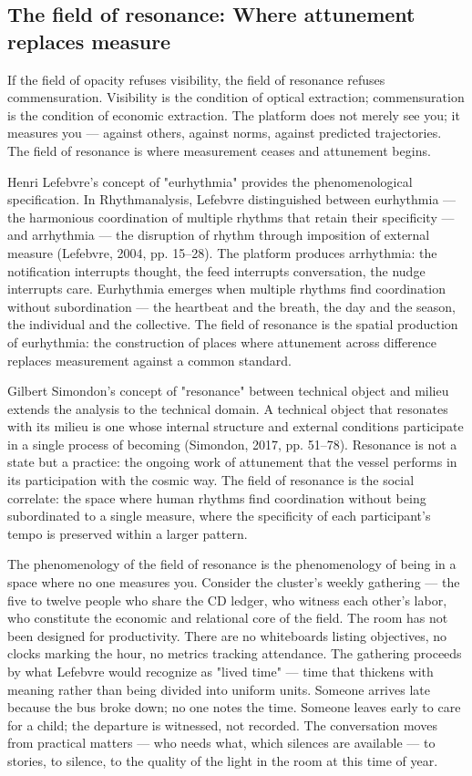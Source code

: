 \subsection{The field of resonance: Where attunement replaces measure}

If the field of opacity refuses visibility, the field of resonance refuses commensuration. Visibility is the condition of optical extraction; commensuration is the condition of economic extraction. The platform does not merely see you; it measures you — against others, against norms, against predicted trajectories. The field of resonance is where measurement ceases and attunement begins.

Henri Lefebvre's concept of "eurhythmia" provides the phenomenological specification. In Rhythmanalysis, Lefebvre distinguished between eurhythmia — the harmonious coordination of multiple rhythms that retain their specificity — and arrhythmia — the disruption of rhythm through imposition of external measure (Lefebvre, 2004, pp. 15–28). The platform produces arrhythmia: the notification interrupts thought, the feed interrupts conversation, the nudge interrupts care. Eurhythmia emerges when multiple rhythms find coordination without subordination — the heartbeat and the breath, the day and the season, the individual and the collective. The field of resonance is the spatial production of eurhythmia: the construction of places where attunement across difference replaces measurement against a common standard.

Gilbert Simondon's concept of "resonance" between technical object and milieu extends the analysis to the technical domain. A technical object that resonates with its milieu is one whose internal structure and external conditions participate in a single process of becoming (Simondon, 2017, pp. 51–78). Resonance is not a state but a practice: the ongoing work of attunement that the vessel performs in its participation with the cosmic way. The field of resonance is the social correlate: the space where human rhythms find coordination without being subordinated to a single measure, where the specificity of each participant's tempo is preserved within a larger pattern.

The phenomenology of the field of resonance is the phenomenology of being in a space where no one measures you. Consider the cluster's weekly gathering — the five to twelve people who share the CD ledger, who witness each other's labor, who constitute the economic and relational core of the field. The room has not been designed for productivity. There are no whiteboards listing objectives, no clocks marking the hour, no metrics tracking attendance. The gathering proceeds by what Lefebvre would recognize as "lived time" — time that thickens with meaning rather than being divided into uniform units. Someone arrives late because the bus broke down; no one notes the time. Someone leaves early to care for a child; the departure is witnessed, not recorded. The conversation moves from practical matters — who needs what, which silences are available — to stories, to silence, to the quality of the light in the room at this time of year.

